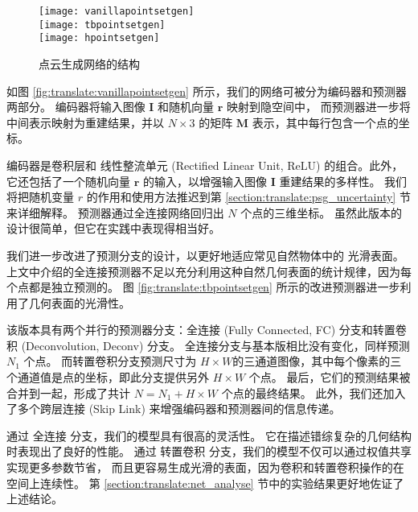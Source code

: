\begin{figure}[h]
	\centering%
	{\texttt{[image: vanillapointsetgen]}}
	\\

	{\texttt{[image: tbpointsetgen]}}
	\\

	{\texttt{[image: hpointsetgen]}}
	\\
	\caption[]{
		点云生成网络的结构} \label{fig:translate:genpointsetgen}
\end{figure}

如图 \ref{fig:translate:vanillapointsetgen} 所示，我们的网络可被分为编码器和预测器两部分。 编码器将输入图像 $\bm I$ 和随机向量 $\bm r$ 映射到隐空间中，
而预测器进一步将中间表示映射为重建结果，并以 $N \times 3$ 的矩阵 $\bm M$ 表示，其中每行包含一个点的坐标。

编码器是卷积层和 线性整流单元 (Rectified Linear Unit, ReLU) 的组合。此外，它还包括了一个随机向量 $\bm r$ 的输入，以增强输入图像 $\bm I$ 重建结果的多样性。
我们将把随机变量 $r$ 的作用和使用方法推迟到第 \ref{section:translate:psg_uncertainty} 节来详细解释。 预测器通过全连接网络回归出 $N$ 个点的三维坐标。 虽然此版本的设计很简单，但它在实践中表现得相当好。

我们进一步改进了预测分支的设计，以更好地适应常见自然物体中的%
光滑表面。上文中介绍的全连接预测器不足以充分利用这种自然几何表面的统计规律，因为每个点都是独立预测的。
图 \ref{fig:translate:tbpointsetgen} 所示的改进预测器进一步利用了几何表面的光滑性。

该版本具有两个并行的预测器分支：全连接 (Fully Connected, FC) 分支和转置卷积 (Deconvolution, Deconv) 分支。
全连接分支与基本版相比没有变化，同样预测 $N_1$ 个点。
而转置卷积分支预测尺寸为 $H \times W$的三通道图像，其中每个像素的三个通道值是点的坐标，即此分支提供另外 $H \times W$ 个点。
最后，它们的预测结果被合并到一起，形成了共计 $N = N_1 + H \times W$ 个点的最终结果。
此外，我们还加入了多个跨层连接 (Skip Link) 来增强编码器和预测器间的信息传递。


通过 全连接 分支，我们的模型具有很高的灵活性。
它在描述错综复杂的几何结构时表现出了良好的性能。 通过 转置卷积 分支，我们的模型不仅可以通过权值共享实现更多参数节省， 而且更容易生成光滑的表面，因为卷积和转置卷积操作的在空间上连续性。
第 \ref{section:translate:net_analyse} 节中的实验结果更好地佐证了上述结论。


